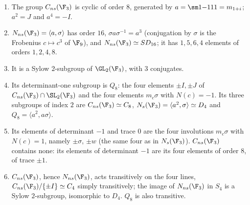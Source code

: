 \begin{proposition}\label{prop:groups:nns3}
\begin{enumerate}[label=(\roman*)]
\item The group $C_{ns}(\F_3)$ is cyclic of order $8$, generated by $a=\sm1{-1}11=m_{1+i}$; $a^2=J$ and $a^4=-I$.
\item $N_{ns}(\F_3)=\langle a,\sigma\rangle$ has order $16$, $\sigma a\sigma^{-1}=a^3$ (conjugation by $\sigma$ is the Frobenius $c\mapsto c^3$ of $\F_9$), and
$N_{ns}(\F_3)\simeq SD_{16}$; it has $1,5,6,4$ elements of orders $1,2,4,8$.
\item It is a Sylow $2$-subgroup of $\GL_2(\F_3)$, with $3$ conjugates.
\item Its determinant-one subgroup is $Q_8$: the four elements $\pm I,\pm J$ of $C_{ns}(\F_3)\cap\SL_2(\F_3)$ and the four elements $m_c\sigma$ with $N(c)=-1$. Its three
subgroups of index $2$ are $C_{ns}(\F_3)\simeq C_8$, $N_s(\F_3)=\langle a^2,\sigma\rangle\simeq D_4$ and $Q_8=\langle a^2,a\sigma\rangle$.
\item Its elements of determinant $-1$ and trace $0$ are the four involutions $m_c\sigma$ with $N(c)=1$, namely $\pm\sigma$, $\pm w$ (the same four as in $N_s(\F_3)$).
$C_{ns}(\F_3)$ contains none: its elements of determinant $-1$ are its four elements of order $8$, of trace $\pm1$.
\item $C_{ns}(\F_3)$, hence $N_{ns}(\F_3)$, acts transitively on the four lines, $C_{ns}(\F_3)/\{\pm I\}\simeq C_4$ simply transitively; the image of $N_{ns}(\F_3)$ in $S_4$
is a Sylow $2$-subgroup, isomorphic to $D_4$. $Q_8$ is also transitive.
\end{enumerate}
\end{proposition}

